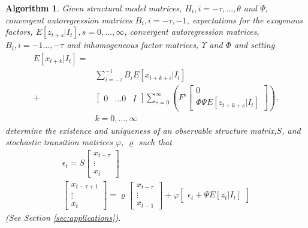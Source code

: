 \documentclass{article}
\newtheorem{rslt}{Algorithm}
\begin{document}
{\begin{rslt}
Given structural model matrices, $H_i, i=-\tau,\ldots,\theta$ and $\Psi$,
 convergent autoregression matrices $B_i,i=-\tau,-1$,
 expectations for the exogenous
factors,
$E[z_{t+s}|I_t],s=0,\ldots,\infty$, convergent autoregression matrices, 
$B_i, i=-1\ldots,-\tau$ and inhomogeneous factor matrices,
$\Upsilon$ and $\Phi$
and setting 
\begin{equation*}
  \label{eq:exp}
\begin{split}E[x_{t+k}|I_t]=&\\
& \sum_{i=-\tau}^{-1} B_i E[x_{t+k+i}|I_t] \\+ 
&  \begin{bmatrix}
  0&\dots 0&I
  \end{bmatrix}
\sum_{s=0}^\infty ( F^{s} 
\begin{bmatrix}
0\\
\Phi \Psi  E[z_{t+k+s}|I_t]
\end{bmatrix}),\\&k=0,\ldots,\infty
\end{split}
\end{equation*}
determine the existence and uniqueness of an
{\em observable structure matrix},$S$, and {\em stochastic transition
matrices} $\varphi$, $\varrho$ such that
\begin{gather*}
\epsilon_t= S \begin{bmatrix}
 x_{t-\tau}\\\vdots\\x_{t}
\end{bmatrix}\\
\begin{bmatrix}
 x_{t-\tau+1}\\\vdots\\x_{t}
\end{bmatrix}= 
\varrho
\begin{bmatrix}
 x_{t-\tau}\\\vdots\\x_{t-1}
\end{bmatrix} +
\varphi
\begin{bmatrix}\epsilon_{t} +
\Psi E[z_t|I_t]
\end{bmatrix}
\end{gather*}
(See Section \ref{sec:applications}).
\end{rslt}



}
\end{document}
